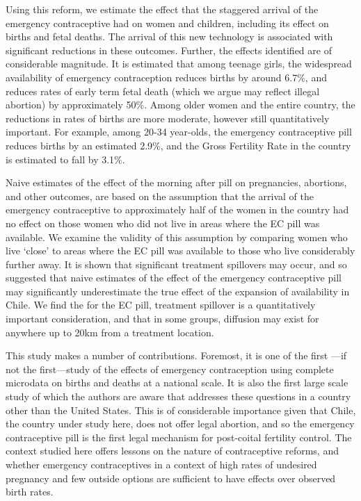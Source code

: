 Using this reform, we estimate the effect that the staggered arrival of the 
emergency contraceptive had on women and children, including its effect on births 
and fetal deaths. The arrival of this new technology is associated with significant 
reductions in these outcomes.  Further, the effects identified are of considerable
magnitude.  It is estimated that among teenage girls, the widespread availability 
of emergency contraception reduces births by around 6.7\%, and reduces rates of early
term fetal death (which we argue may reflect illegal abortion) by approximately 50\%. 
Among older women and the entire country, the reductions in rates of births are more 
moderate, however still quantitatively important.  For example, among 20-34 year-olds,
the emergency contraceptive pill reduces births by an estimated 2.9\%, and the Gross
Fertility Rate in the country is estimated to fall by 3.1\%.
\nocite{Goldin2006, Bailey2011}
\nocite{KearnerLevine2009}
\nocite{Ananatetal2007,ThomasDouglas1996,Levineetal1996}

Naive estimates of the effect of the morning after pill on pregnancies, abortions, 
and other outcomes, are based on the assumption that the arrival of the emergency 
contraceptive to approximately half of the women in the country had no effect on 
those women who did not live in areas where the EC pill was available.  We examine 
the validity of this assumption by comparing women who live `close' to areas where 
the EC pill was available to those who live considerably further away.  It is shown 
that significant treatment spillovers may occur, and so suggested that naive 
estimates of the effect of the emergency contraceptive pill may significantly 
underestimate the true effect of the expansion of availability in Chile.  We find
the for the EC pill, treatment spillover is a quantitatively important
consideration, and that in some groups, diffusion may exist for anywhere up to 20km
from a treatment location.

This study makes a number of contributions.  Foremost, it is one of the first%
---if not the first---study of the effects of emergency contraception using 
complete microdata on births and deaths at a national scale. It is also the first 
large scale study of which the authors are aware that addresses these questions 
in a country other than the United States.  This is of considerable importance 
given that Chile, the country under study here, does not offer legal abortion, 
and so the emergency contraceptive pill is the first legal mechanism for 
post-coital fertility control.  The context studied here offers lessons on the 
nature of contraceptive reforms, and whether emergency contraceptives in a 
context of high rates of undesired pregnancy and few outside options are 
sufficient to have effects over observed birth rates.

